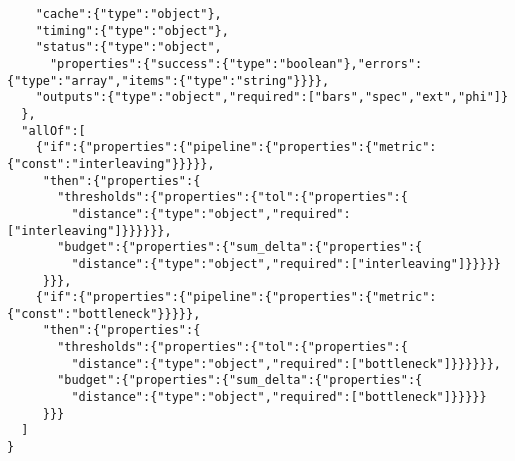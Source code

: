 \documentclass[11pt]{article}
\numberwithin{equation}{section}
\theoremstyle{definition}
\begin{document}
\begin{verbatim}
    "cache":{"type":"object"},
    "timing":{"type":"object"},
    "status":{"type":"object",
      "properties":{"success":{"type":"boolean"},"errors":{"type":"array","items":{"type":"string"}}}},
    "outputs":{"type":"object","required":["bars","spec","ext","phi"]}
  },
  "allOf":[
    {"if":{"properties":{"pipeline":{"properties":{"metric":{"const":"interleaving"}}}}},
     "then":{"properties":{
       "thresholds":{"properties":{"tol":{"properties":{
         "distance":{"type":"object","required":["interleaving"]}}}}}},
       "budget":{"properties":{"sum_delta":{"properties":{
         "distance":{"type":"object","required":["interleaving"]}}}}}
     }}},
    {"if":{"properties":{"pipeline":{"properties":{"metric":{"const":"bottleneck"}}}}},
     "then":{"properties":{
       "thresholds":{"properties":{"tol":{"properties":{
         "distance":{"type":"object","required":["bottleneck"]}}}}}},
       "budget":{"properties":{"sum_delta":{"properties":{
         "distance":{"type":"object","required":["bottleneck"]}}}}}
     }}}
  ]
}
\end{verbatim}
\end{document}
